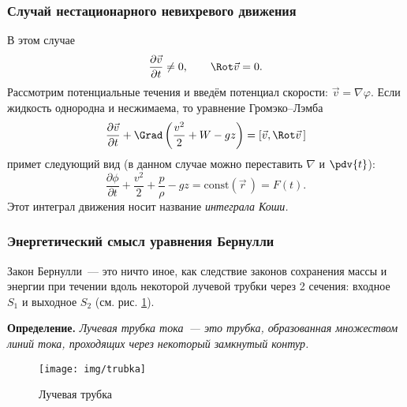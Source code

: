 \subsubsection{Случай нестационарного невихревого движения}
В этом случае
\begin{equation}\begin{aligned}
	\frac { \partial \vec{v} } { \partial t } \neq 0, \qquad
	\Rot \vec{v} = 0.
\end{aligned}\end{equation}
Рассмотрим  потенциальные течения и введём потенциал скорости: $ \vec{v} = \nabla \varphi $. Если жидкость однородна и несжимаема,  то уравнение Громэко--Лэмба
\begin{equation}
\frac { \partial \vec{v} } { \partial t } +\Grad \left( \frac { v^2 } { 2 } + W - g z \right) = [ \vec{v} , \Rot \vec{v}\,]
\end{equation}
примет следующий вид (в данном случае можно переставить $\nabla$ и $\pdv{t}$):
\begin{equation}
\frac { \partial \phi } { \partial t } + \frac { v^2 } { 2 } + \frac{p}{\rho} - g z = \mathrm { const } (\vec{r}\,) = F(t).
\end{equation}
Этот интеграл движения носит название \textit{интеграла Коши.} %

\subsubsection{Энергетический смысл уравнения Бернулли}

Закон Бернулли~---  это ничто иное, как следствие законов сохранения массы и энергии при течении вдоль некоторой лучевой трубки через 2 сечения: входное $S_1$ и выходное $S_2$ (см. рис. \ref{fig:trubbka}).

\textbf{Определение. } \textit{Лучевая трубка тока~--- это трубка, образованная множеством линий тока, проходящих через некоторый замкнутый контур.}
\begin{figure}[H]
	\centering
	\texttt{[image: img/trubka]}
	\caption{Лучевая трубка}
	\label{fig:trubbka}
\end{figure}

